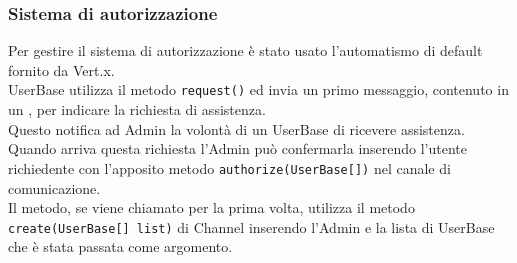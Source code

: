       \subsubsection*{Sistema di autorizzazione}
        Per gestire il sistema di autorizzazione è stato usato l'automatismo di default fornito da Vert.x.\\
        UserBase utilizza il metodo \verb+request()+ ed invia un primo messaggio, contenuto in un , per indicare la richiesta di assistenza.\\
        Questo notifica ad Admin la volontà di un UserBase di ricevere assistenza.\\
        Quando arriva questa richiesta l'Admin può confermarla inserendo l'utente richiedente con l'apposito metodo \verb+authorize(UserBase[])+ nel canale di comunicazione.\\
        Il metodo, se viene chiamato per la prima volta, utilizza il metodo \verb+create(UserBase[] list)+ di Channel inserendo l'Admin e la lista di UserBase che è stata passata come argomento.\\

